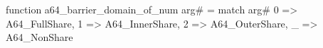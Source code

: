 function a64_barrier_domain_of_num arg# = match arg# {
  0 => A64_FullShare,
  1 => A64_InnerShare,
  2 => A64_OuterShare,
  _ => A64_NonShare
}
